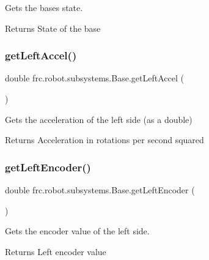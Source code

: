 Gets the base\textquotesingle{}s state. 

\begin{DoxyReturn}{Returns}
State of the base 
\end{DoxyReturn}
\mbox{\label{classfrc_1_1robot_1_1subsystems_1_1_base_a7d0b5e6419c7da9741f86807768f77fe}} 
\subsubsection{\texorpdfstring{getLeftAccel()}{getLeftAccel()}}
{\footnotesize\ttfamily double frc.\+robot.\+subsystems.\+Base.\+get\+Left\+Accel (\begin{DoxyParamCaption}{ }\end{DoxyParamCaption})\hspace{0.3cm}{\ttfamily [inline]}}



Gets the acceleration of the left side (as a double) 

\begin{DoxyReturn}{Returns}
Acceleration in rotations per second squared 
\end{DoxyReturn}
\mbox{\label{classfrc_1_1robot_1_1subsystems_1_1_base_a008f98f74ff02b06456cb913ae634bdc}} 
\subsubsection{\texorpdfstring{getLeftEncoder()}{getLeftEncoder()}}
{\footnotesize\ttfamily double frc.\+robot.\+subsystems.\+Base.\+get\+Left\+Encoder (\begin{DoxyParamCaption}{ }\end{DoxyParamCaption})\hspace{0.3cm}{\ttfamily [inline]}}



Gets the encoder value of the left side. 

\begin{DoxyReturn}{Returns}
Left encoder value 
\end{DoxyReturn}
\mbox{\label{classfrc_1_1robot_1_1subsystems_1_1_base_af8159ba0759e6c3c0056445d481223da}} 
